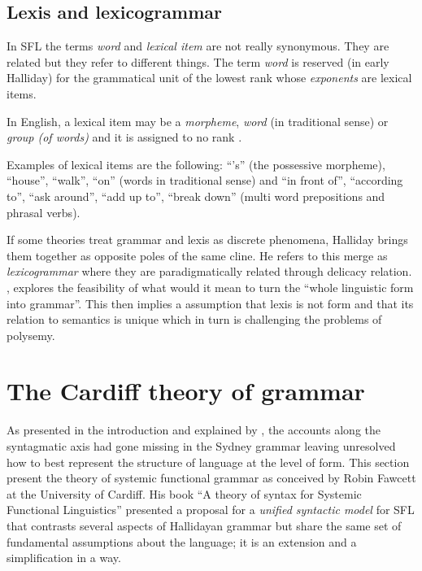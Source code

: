 \subsection{Lexis and lexicogrammar}
In SFL the terms \textit{word} and \textit{lexical item} are not really synonymous. They are related but they refer to different things. The term \textit{word} is reserved (in early Halliday) for the grammatical unit of the lowest rank whose \textit{exponents} are lexical items. %

\begin{definition}\label{def:lexical-item}
	In English, a lexical item may be a \textit{morpheme}, \textit{word} (in traditional sense) or \textit{group (of words)} and it is assigned to no rank \citep[60]{Halliday2002}.
\end{definition}

Examples of lexical items are the following: ``'s'' (the possessive morpheme), ``house'', ``walk'', ``on'' (words in traditional sense) and ``in front of'', ``according to'', ``ask around'', ``add up to'', ``break down'' (multi word prepositions and phrasal verbs).

If some theories treat grammar and lexis as discrete phenomena, Halliday brings them together as opposite poles of the same cline. He refers to this merge as \textit{lexicogrammar} where they are paradigmatically related through delicacy relation.
\citet{Hasan2014}, explores the feasibility of what would it mean to turn the ``whole linguistic form into grammar''. This then implies a assumption that lexis is not form and that its relation to semantics is unique which  in turn is challenging the problems of polysemy. 


\section{The Cardiff theory of grammar}
\label{sec:cardiff-theory-grammar}
As presented in the introduction and explained by \citet{Bateman2008}, the accounts along the syntagmatic axis had gone missing in the Sydney grammar leaving unresolved how to best represent the structure of language at the level of form. This section present the theory of systemic functional grammar as conceived by Robin Fawcett at the University of Cardiff. His book ``A theory of syntax for Systemic Functional Linguistics'' \citep{Fawcett2000} presented a proposal for a \textit{unified syntactic model} for SFL that contrasts several aspects of Hallidayan grammar but share the same set of fundamental assumptions about the language; it is an extension and a simplification in a way.

